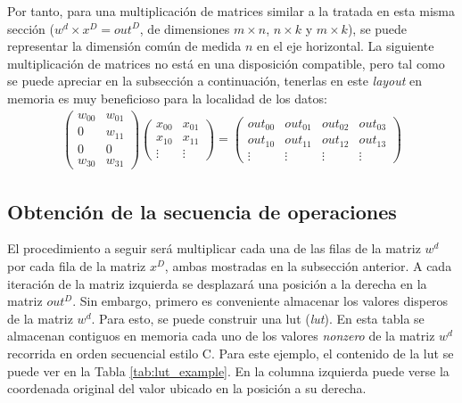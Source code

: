 Por tanto, para una multiplicación de matrices similar a la tratada en esta misma sección ($w^{d} \times x^{D} = out^{D}$, de dimensiones $m \times n$, $n \times k$ y $m \times k$), se puede representar la dimensión común de medida $n$ en el eje horizontal. La siguiente multiplicación de matrices no está en una disposición compatible, pero tal como se puede apreciar en la subsección a continuación, tenerlas en este \textit{layout} en memoria es muy beneficioso para la localidad de los datos: 
\begin{gather}
    \begin{pmatrix}
        w_{00} & w_{01}\\
        0 & w_{11}\\
        0 & 0\\
        w_{30} & w_{31}
    \end{pmatrix}	
    \begin{pmatrix}
        x_{00} & x_{01}\\
        x_{10} & x_{11}\\
        \vdots & \vdots
    \end{pmatrix}
    =
    \begin{pmatrix}
        out_{00} & out_{01} & out_{02} & out_{03}\\
        out_{10} & out_{11} & out_{12} & out_{13}\\
        \vdots & \vdots & \vdots & \vdots
    \end{pmatrix} \nonumber
\end{gather}

\subsection{Obtención de la secuencia de operaciones}
\label{ssec:obtencion_secuencia_operaciones}
El procedimiento a seguir será multiplicar cada una de las filas de la matriz $w^{d}$ por cada fila de la matriz $x^{D}$, ambas mostradas en la subsección anterior. A cada iteración de la matriz izquierda se desplazará una posición a la derecha en la matriz $out^{D}$. Sin embargo, primero es conveniente almacenar los valores disperos de la matriz $w^{d}$. Para esto, se puede construir una \acrshort{lut} (\textit{\acrlong{lut}}). En esta tabla se almacenan contiguos en memoria cada uno de los valores \textit{nonzero} de la matriz $w^{d}$ recorrida en orden secuencial estilo C. Para este ejemplo, el contenido de la \acrshort{lut} se puede ver en la Tabla \ref{tab:lut_example}. En la columna izquierda puede verse la coordenada original del valor ubicado en la posición a su derecha.

